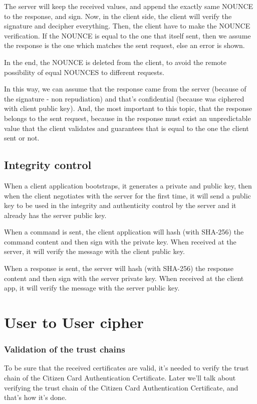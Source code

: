 \documentclass[pdftex,12pt,a4paper]{report}
\begin{document}
The server will keep the received values, and append the exactly same NOUNCE to the response, and sign.
Now, in the client side, the client will verify the signature and decipher everything. Then, the client have to make the NOUNCE verification. If the NOUNCE is equal to the one that itself sent, then we assume the response is the one which matches the sent request, else an error is shown.

In the end, the NOUNCE is deleted from the client, to avoid the remote possibility of equal NOUNCES to different requests.

In this way, we can assume that the response came from the server (because of the signature - non repudiation) and that's confidential (because was ciphered with client public key). And, the most important to this topic, that the response belongs to the sent request, because in the response must exist an unpredictable value that the client validates and guarantees that is equal to the one the client sent or not.


\subsection{Integrity control}

When a client application bootstraps, it generates a private and public key, then when the client negotiates with the server for the first time, it will send a public key to be used in the integrity and authenticity control by the server and it already has the server public key.

When a command is sent, the client application will hash (with SHA-256) the command content and then sign with the private key. When received at the server, it will verify the message with the client public key.

When a response is sent, the server will hash (with SHA-256) the response content and then sign with the server private key. When received at the client app, it will verify the message with the server public key.

\section{User to User cipher}

\subsubsection{Validation of the trust chains}

To be sure that the received certificates are valid, it's needed to verify the trust chain of the Citizen Card Authentication Certificate. Later we'll talk about verifying the trust chain of the Citizen Card Authentication Certificate, and that's how it's done.
\end{document}
